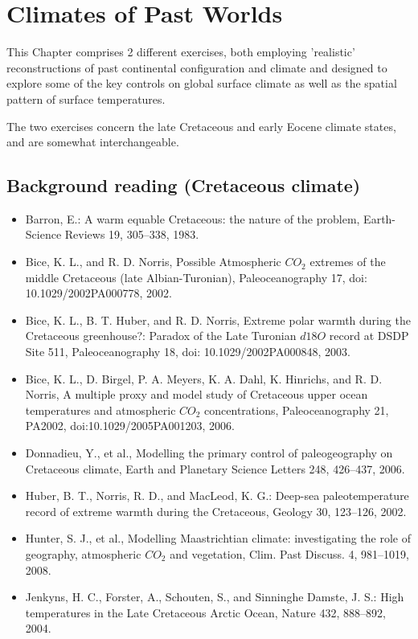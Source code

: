 \documentclass[11pt,fleqn]{book} %
\begin{document}
\cleardoublepage


\chapter{Climates of Past Worlds}

\hfill \break

\vspace{12mm}

\noindent This Chapter comprises 2 different exercises, both employing 'realistic' reconstructions of past continental configuration and climate and designed to explore some of the key controls on global surface climate as well as the spatial pattern of surface temperatures.

The two exercises concern the late Cretaceous and early Eocene climate states, and are somewhat interchangeable.

\section*{Background reading (Cretaceous climate)}
\begin{itemize}
\item Barron, E.: A warm equable Cretaceous: the nature of the problem, Earth-Science Reviews 19, 305–338, 1983.
\item Bice, K. L., and R. D. Norris, Possible Atmospheric \(CO_{2}\) extremes of the middle Cretaceous (late Albian-Turonian), Paleoceanography 17, doi: 10.1029/2002PA000778, 2002.
\item Bice, K. L., B. T. Huber, and R. D. Norris, Extreme polar warmth during the Cretaceous greenhouse?: Paradox of the Late Turonian \(d18O\) record at DSDP Site 511, Paleoceanography 18, doi: 10.1029/2002PA000848, 2003.
\item Bice, K. L., D. Birgel, P. A. Meyers, K. A. Dahl, K. Hinrichs, and R. D. Norris, A multiple proxy and model study of Cretaceous upper ocean temperatures and atmospheric \(CO_{2}\) concentrations, Paleoceanography 21, PA2002, doi:10.1029/2005PA001203, 2006.
\item Donnadieu, Y., et al., Modelling the primary control of paleogeography on Cretaceous climate, Earth and Planetary Science Letters 248, 426–437, 2006.
\item Huber, B. T., Norris, R. D., and MacLeod, K. G.: Deep-sea paleotemperature record of extreme warmth during the Cretaceous, Geology 30, 123–126, 2002.
\item Hunter, S. J., et al., Modelling Maastrichtian climate: investigating the role of geography, atmospheric \(CO_{2}\) and vegetation, Clim. Past Discuss. 4, 981–1019, 2008.
\item Jenkyns, H. C., Forster, A., Schouten, S., and Sinninghe Damste, J. S.: High temperatures in the Late Cretaceous Arctic Ocean, Nature 432, 888–892, 2004.
\end{itemize}
\end{document}
